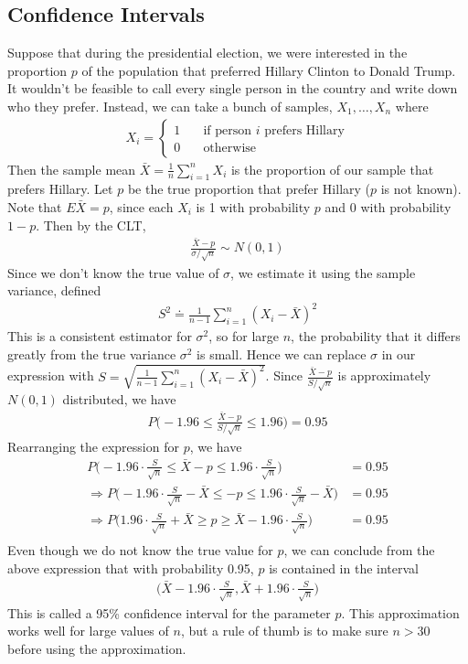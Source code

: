 \documentclass[11pt,letterpaper]{article}
\numberwithin{theorem}{section}
\numberwithin{definition}{section}
\numberwithin{lemma}{section}
\numberwithin{corollary}{section}
\numberwithin{proposition}{section}
\theoremstyle{definition}
\numberwithin{remark}{section}
\numberwithin{claim}{section}
\numberwithin{observation}{section}
\numberwithin{fact}{section}
\numberwithin{assumption}{section}
\numberwithin{example}{section}
\numberwithin{exercise}{section}
\begin{document}
\subsection{Confidence Intervals}
Suppose that during the presidential election, we were interested in the proportion $p$ of the population that preferred Hillary Clinton to Donald Trump. It wouldn't be feasible to call every single person in the country and write down who they prefer. Instead, we can take a bunch of samples, $X_1,\dots,X_n$ where
\begin{align*}
X_i = \begin{cases}
1 \hspace{1em} &\text{if person $i$ prefers Hillary} \\
0 &\text{otherwise}
\end{cases}
\end{align*}
Then the sample mean $\bar{X} = \frac{1}{n} \sum_{i=1}^n X_i$ is the proportion of our sample that prefers Hillary. Let $p$ be the true proportion that prefer Hillary ($p$ is not known). Note that $E\bar{X} = p$, since each $X_i$ is 1 with probability $p$ and 0 with probability $1-p$. Then by the CLT,
\begin{align*}
\frac{\bar{X}-p}{\sigma/\sqrt{n}} \sim N(0,1)
\end{align*}
Since we don't know the true value of $\sigma$, we estimate it using the sample variance, defined
\begin{align*}
S^2 \doteq \frac{1}{n-1} \sum_{i=1}^n (X_i - \bar{X})^2
\end{align*}
This is a consistent estimator for $\sigma^2$, so for large $n$, the probability that it differs greatly from the true variance $\sigma^2$ is small. Hence we can replace $\sigma$ in our expression with $S = \sqrt{\frac{1}{n-1}\sum_{i=1}^n (X_i - \bar{X})^2}$. Since $\frac{\bar{X}-p}{S/\sqrt{n}}$ is approximately $N(0,1)$ distributed, we have
\begin{align*}
P\Big(-1.96 \leq \frac{\bar{X}-p}{S/\sqrt{n}} \leq 1.96\Big) = 0.95
\end{align*}
Rearranging the expression for $p$, we have
\begin{align*}
P\Big(-1.96\cdot \frac{S}{\sqrt{n}} \leq \bar{X}-p \leq 1.96\cdot \frac{S}{\sqrt{n}}\Big) &= 0.95 \\
\Rightarrow P\Big(-1.96\cdot \frac{S}{\sqrt{n}} - \bar{X} \leq -p \leq 1.96\cdot \frac{S}{\sqrt{n}} - \bar{X}\Big) &= 0.95 \\
\Rightarrow P\Big(1.96\cdot \frac{S}{\sqrt{n}} + \bar{X} \geq p \geq \bar{X}-1.96\cdot \frac{S}{\sqrt{n}} \Big) &= 0.95 \\
\end{align*}
Even though we do not know the true value for $p$, we can conclude from the above expression that with probability 0.95, $p$ is contained in the interval
\begin{align*}
\Big(\bar{X} - 1.96 \cdot \frac{S}{\sqrt{n}}, \bar{X} + 1.96 \cdot \frac{S}{\sqrt{n}} \Big)
\end{align*}
This is called a 95\% confidence interval for the parameter $p$. This approximation works well for large values of $n$, but a rule of thumb is to make sure $n > 30$ before using the approximation.
\end{document}
